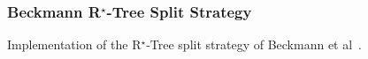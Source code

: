 %
%
%
%


\subsubsection{Beckmann R$^\star$-Tree Split Strategy}

Implementation of the R$^\star$-Tree split strategy of Beckmann
et al~\cite{bkss-rtera-90}.

